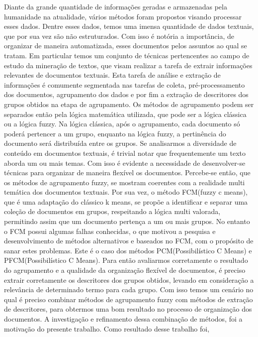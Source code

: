 Diante da grande quantidade de informações geradas e armazenadas pela humanidade na atualidade, 
vários métodos foram propostos visando processar esses dados. Dentre esses dados, temos uma imensa
quantidade de dados textuais, que por sua vez são não estruturados. Com isso é notória a importância,
de organizar de maneira automatizada, esses documentos pelos assuntos ao qual se tratam. Em particular temos um conjunto de técnicas pertencentes ao campo de estudo da mineração de textos, que visam realizar a tarefa de extrair informações relevantes de documentos textuais. 
Esta tarefa de análise e extração de informações é 
comumente segmentada nas tarefas de coleta, pré-processamento dos documentos, agrupamento dos dados
e por fim a extração de descritores dos grupos obtidos na etapa de agrupamento. Os métodos de agrupamento podem ser separados então pela lógica matemática utilizada, que pode ser a lógica clássica ou a lógica fuzzy. Na lógica clássica, após o agrupamento, cada documento só poderá pertencer a um grupo, enquanto na lógica fuzzy, a pertinência do documento será distribuída entre os grupos. 
Se analisarmos a diversidade de conteúdo em documentos textuais, é trivial notar que frequentemente
um texto aborda um ou mais temas. Com isso é evidente a necessidade de desenvolver-se técnicas para
organizar de maneira flexível os documentos. Percebe-se então, que os métodos de agrupamento fuzzy,
se mostram coerentes com a realidade multi temática dos documentos textuais. Por sua vez, o método FCM(fuzzy c means), que é uma adaptação do clássico k means, se propõe a identificar e separar uma coleção de documentos em grupos, respeitando a lógica multi valorada, permitindo assim que um documento pertença a um ou mais grupos. No entanto o FCM possui algumas falhas conhecidas, o que motivou a pesquisa e desenvolvimento de métodos alternativos e baseados no FCM, com o propósito de sanar estes problemas. Este é o caso dos métodos PCM(Possibilístico C Means) e PFCM(Possibilístico C Means). 
Para então avaliarmos corretamente o resultado do agrupamento e a qualidade da organização flexível 
de documentos, é preciso extrair corretamente os descritores dos grupos obtidos, levando em 
consideração a relevância de determinado termo para cada grupo. Com isso temos um cenário no qual é 
preciso combinar métodos de agrupamento fuzzy com métodos de extração de descritores, para obtermos
uma bom resultado no processo de organização dos documentos. A investigação e refinamento dessa 
combinação de métodos, foi a motivação do presente trabalho. Como resultado desse trabalho foi,
